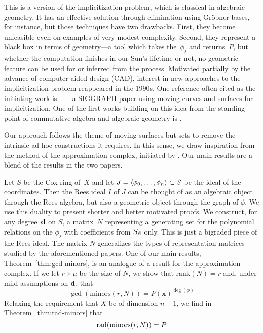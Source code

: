 \documentclass[fleqn,reqno]{amsart}
\begin{document}
\begin{paragraf*}
This is a version of the implicitization problem, which is classical in algebraic geometry.
It has an effective solution through elimination using Gr\"obner bases, for instance,
but those techniques have two drawbacks.
First, they become unfeasible even on examples of very modest complexity.
Second, they represent a black box in terms of geometry---a tool which
takes the~$\phi_j$ and returns~$P$,
but whether the computation finishes in our Sun's lifetime or not,
no geometric feature can be used for or inferred from the process.
Motivated partially by the advance of computer aided design (CAD),
interest in new approaches to the implicitization problem
reappeared in the 1990s.
One reference often cited as the initiating work is \cite{SC-95}~---
a SIGGRAPH paper using moving curves and surfaces for implicitization.
One of the first works building on this idea from the standing point
of commutative algebra and algebraic geometry is \citet{CGZ-00}.
\end{paragraf*}

\begin{paragraf*}
Our approach follows the theme of moving surfaces but sets to remove the intrinsic
ad-hoc constructions it requires.
In this sense,
we draw inspiration from the method of the approximation complex,
initiated by \citet{BJ-03}.
Our main results are a blend of the results in the two papers.

Let $S$ be the Cox ring of~$X$ and
let $J=\langle\phi_0,\ldots,\phi_n\rangle\subset S$ be the ideal of the coordinates.
Then the Rees ideal $I$ of $J$ can be thought of as
an algebraic object through the Rees algebra, but also
a geometric object through the graph of $\phi$.
We use this duality to present shorter and better motivated proofs.
We construct, for any degree~$\mathbf d$ on $S$,
a matrix~$N$ representing a generating set for the polynomial relations on the $\phi_j$
with coefficients from $S_\mathbf d$ only.
This is just a bigraded piece of the Rees ideal.
The matrix $N$ generalizes the types of representation matrices
studied by the aforementioned papers.
One of our main results, Theorem~\ref{thm:gcd-minors},
is an analogue of a result for the approximation complex.
If we let $r\times\mu$ be the size of $N$,
we show that $\text{rank}(N)=r$ and,
under mild assumptions on $\mathbf d$, that
\[
	\gcd(\text{minors}(r,N))=P(\mathbf x)^{\deg(\phi)}
\]
Relaxing the requirement that $X$ be of dimension $n-1$,
we find in Theorem~\ref{thm:rad-minors} that
\[
	\operatorname{rad}(\text{minors}(r,N))=P
\]
\end{paragraf*}
\end{document}
